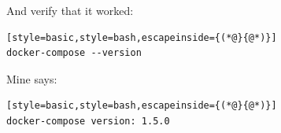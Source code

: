 \documentclass[12pt, a4paper, twoside, openany, titlepage]{book}
\begin{document}
And verify that it worked:
\begin{lstlisting}[style=basic,style=bash,escapeinside={(*@}{@*)}]
docker-compose --version
\end{lstlisting}
Mine says:
\begin{lstlisting}[style=basic,style=bash,escapeinside={(*@}{@*)}]
docker-compose version: 1.5.0
\end{lstlisting}









\backmatter

\printindex
\end{document}
